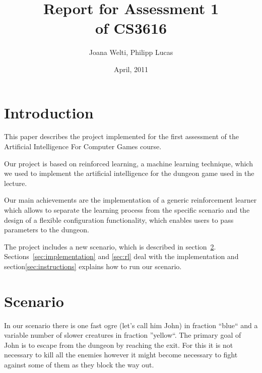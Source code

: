 \documentclass[a4paper,10pt]{scrartcl}
\title{Report for Assessment 1 \\ \large{of CS3616}}
\author{Joana Welti, Philipp Lucas}
\date{April, 2011}
\begin{document}

\maketitle
\newpage

\tableofcontents

\newpage


\section{Introduction}
This paper describes the project implemented for the first assessment of the Artificial Intelligence For Computer Games course. 

Our project is based on reinforced learning, a machine learning technique, which we used to implement the artificial intelligence for the dungeon game used in the lecture. 

Our main achievements are the implementation of a generic reinforcement learner which allows to separate the learning process from the specific scenario and the design of a flexible configuration functionality, which enables users to pass parameters to the dungeon. 

The project includes a new scenario, which is described in section~\ref{sec:scenario}. Sections~\ref{sec:implementation} and \ref{sec:rl} deal with the implementation and section\ref{sec:instructions} explains how to run our scenario. 
 
\section{Scenario}\label{sec:scenario}
In our scenario there is one fast ogre (let's call him John) in fraction ``blue`` and a variable number of slower creatures in fraction ''yellow``. The primary goal of John is to escape from the dungeon by reaching the exit. For this it is not necessary to kill all the enemies however it might become necessary to fight against some of them as they block the way out. 
\end{document}
